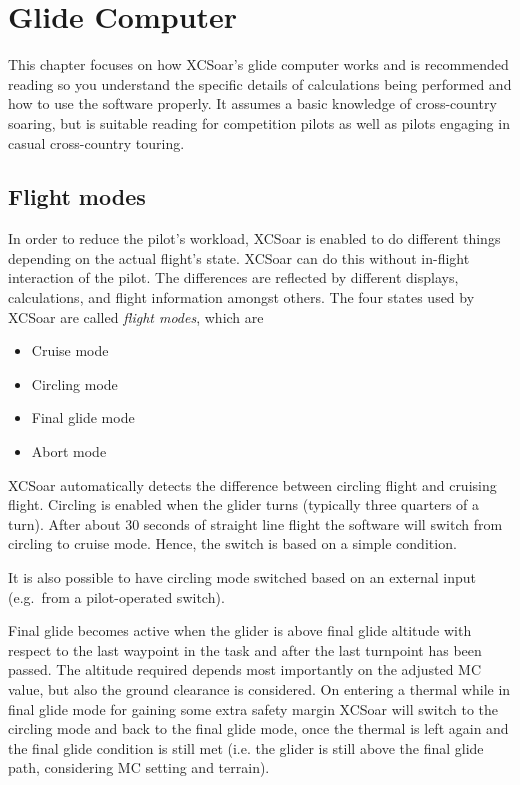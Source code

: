 \chapter{Glide Computer}\label{cha:glide}
This chapter focuses on how XCSoar's glide computer works and is
recommended reading so you understand the specific details of
calculations being performed and how to use the software properly.  It
assumes a basic knowledge of cross-country soaring, but is suitable
reading for competition pilots as well as pilots engaging in casual
cross-country touring.


\section{Flight modes} \label{sec:flightmodes}

In order to reduce the pilot's workload, XCSoar is enabled to do 
different things depending on the actual flight's state. XCSoar can 
do this without in-flight interaction of the pilot. The differences are 
reflected by different displays, calculations, and flight information 
amongst others. The four states used by XCSoar are called 
\emph{flight modes}, which are
\begin{itemize}
\item Cruise mode
\item Circling mode
\item Final glide mode
\item Abort mode
\end{itemize}
XCSoar automatically detects the difference between circling flight and 
cruising flight. Circling is enabled when the glider turns (typically 
three quarters of a turn). After about 30 seconds of straight line flight 
the software will switch from circling to cruise mode. Hence, the switch 
is based on a simple condition.

It is also possible to have circling mode switched based on an external 
input (e.g.\ from a pilot-operated switch).

Final glide becomes active when the glider is above final glide 
altitude with respect to the last waypoint in the task and after the 
last turnpoint has been passed. The altitude required depends most 
importantly on the adjusted MC value, but also the ground clearance 
is considered. On entering a thermal while in final glide mode for 
gaining some extra safety margin XCSoar will switch to the circling 
mode and back to the final glide mode, once the thermal is left again 
and the final glide condition is still met (i.e. the glider is still 
above the final glide path, considering MC setting and terrain).

